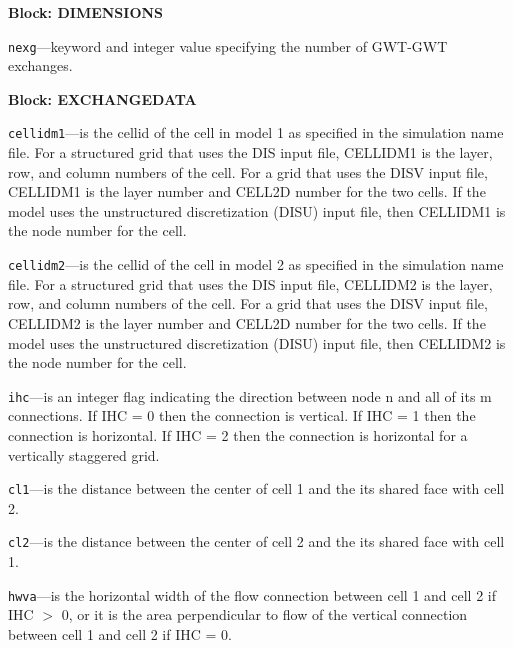 \item \textbf{Block: DIMENSIONS}

\begin{description}
\item \texttt{nexg}---keyword and integer value specifying the number of GWT-GWT exchanges.

\end{description}
\item \textbf{Block: EXCHANGEDATA}

\begin{description}
\item \texttt{cellidm1}---is the cellid of the cell in model 1 as specified in the simulation name file. For a structured grid that uses the DIS input file, CELLIDM1 is the layer, row, and column numbers of the cell.   For a grid that uses the DISV input file, CELLIDM1 is the layer number and CELL2D number for the two cells.  If the model uses the unstructured discretization (DISU) input file, then CELLIDM1 is the node number for the cell.

\item \texttt{cellidm2}---is the cellid of the cell in model 2 as specified in the simulation name file. For a structured grid that uses the DIS input file, CELLIDM2 is the layer, row, and column numbers of the cell.   For a grid that uses the DISV input file, CELLIDM2 is the layer number and CELL2D number for the two cells.  If the model uses the unstructured discretization (DISU) input file, then CELLIDM2 is the node number for the cell.

\item \texttt{ihc}---is an integer flag indicating the direction between node n and all of its m connections. If IHC = 0 then the connection is vertical.  If IHC = 1 then the connection is horizontal. If IHC = 2 then the connection is horizontal for a vertically staggered grid.

\item \texttt{cl1}---is the distance between the center of cell 1 and the its shared face with cell 2.

\item \texttt{cl2}---is the distance between the center of cell 2 and the its shared face with cell 1.

\item \texttt{hwva}---is the horizontal width of the flow connection between cell 1 and cell 2 if IHC $>$ 0, or it is the area perpendicular to flow of the vertical connection between cell 1 and cell 2 if IHC = 0.


\end{description}
